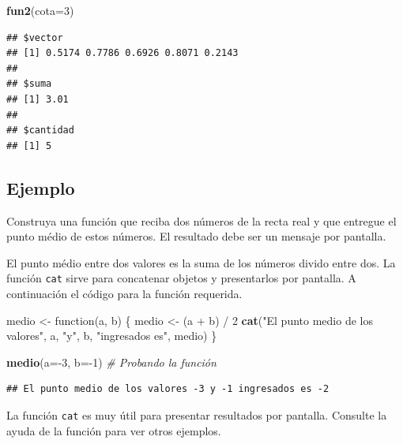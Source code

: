 \documentclass[10pt,]{krantz}
\makeatletter
\newenvironment{Shaded}{\begin{snugshade}}{\end{snugshade}}
\newcommand{\KeywordTok}[1]{\textcolor[rgb]{0.13,0.29,0.53}{\textbf{{#1}}}}
\newcommand{\DataTypeTok}[1]{\textcolor[rgb]{0.13,0.29,0.53}{{#1}}}
\newcommand{\DecValTok}[1]{\textcolor[rgb]{0.00,0.00,0.81}{{#1}}}
\newcommand{\StringTok}[1]{\textcolor[rgb]{0.31,0.60,0.02}{{#1}}}
\newcommand{\CommentTok}[1]{\textcolor[rgb]{0.56,0.35,0.01}{\textit{{#1}}}}
\newcommand{\NormalTok}[1]{{#1}}
\newenvironment{kframe}{%
\medskip{}
\setlength{\fboxsep}{.8em}
 \def\at@end@of@kframe{}%
 \ifinner\ifhmode%
  \def\at@end@of@kframe{\end{minipage}}%
  \begin{minipage}{\columnwidth}%
 \fi\fi%
 \def\FrameCommand##1{\hskip\@totalleftmargin \hskip-\fboxsep
 \colorbox{shadecolor}{##1}\hskip-\fboxsep
     \hskip-\linewidth \hskip-\@totalleftmargin \hskip\columnwidth}%
 \MakeFramed {\advance\hsize-\width
   \@totalleftmargin\z@ \linewidth\hsize
   \@setminipage}}%
 {\par\unskip\endMakeFramed%
 \at@end@of@kframe}
\renewenvironment{Shaded}{\begin{kframe}}{\end{kframe}}
\let\BeginKnitrBlock\begin \let\EndKnitrBlock\end
\makeatother
\begin{document}
\begin{Shaded}
\begin{Highlighting}[]
\KeywordTok{fun2}\NormalTok{(}\DataTypeTok{cota=}\DecValTok{3}\NormalTok{)}
\end{Highlighting}
\end{Shaded}

\begin{verbatim}
## $vector
## [1] 0.5174 0.7786 0.6926 0.8071 0.2143
## 
## $suma
## [1] 3.01
## 
## $cantidad
## [1] 5
\end{verbatim}

\subsection*{Ejemplo}\label{ejemplo-23}


Construya una función que reciba dos números de la recta real y que
entregue el punto médio de estos números. El resultado debe ser un
mensaje por pantalla.

El punto médio entre dos valores es la suma de los números divido entre
dos. La función \texttt{cat} sirve para concatenar objetos y
presentarlos por pantalla. A continuación el código para la función
requerida.

\begin{Shaded}
\begin{Highlighting}[]
\NormalTok{medio <-}\StringTok{ }\NormalTok{function(a, b) \{}
  \NormalTok{medio <-}\StringTok{ }\NormalTok{(a +}\StringTok{ }\NormalTok{b) /}\StringTok{ }\DecValTok{2}
  \KeywordTok{cat}\NormalTok{(}\StringTok{"El punto medio de los valores"}\NormalTok{,}
      \NormalTok{a, }\StringTok{"y"}\NormalTok{, b,}
      \StringTok{"ingresados es"}\NormalTok{, medio)}
\NormalTok{\}}

\KeywordTok{medio}\NormalTok{(}\DataTypeTok{a=}\NormalTok{-}\DecValTok{3}\NormalTok{, }\DataTypeTok{b=}\NormalTok{-}\DecValTok{1}\NormalTok{)  }\CommentTok{# Probando la función}
\end{Highlighting}
\end{Shaded}

\begin{verbatim}
## El punto medio de los valores -3 y -1 ingresados es -2
\end{verbatim}

\BeginKnitrBlock{rmdnote}
La función \texttt{cat} es muy útil para presentar resultados por
pantalla. Consulte la ayuda de la función para ver otros ejemplos.
\EndKnitrBlock{rmdnote}
\end{document}
